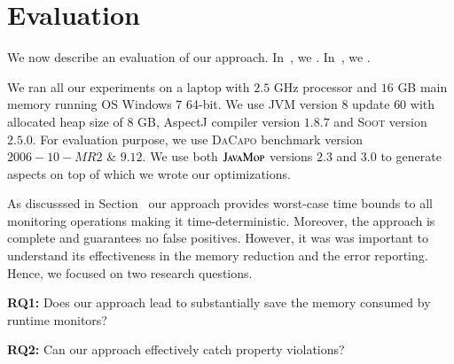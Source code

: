 \section{Evaluation}
\label{sec:evaluation}

We now describe an evaluation of our approach. 
In~, we . 
In~, we . 


We ran all our experiments on a laptop with $2.5$ GHz processor and $16$ GB main
memory running OS Windows 7 64-bit. We use JVM version $8$ update $60$ with
allocated heap size of $8$ GB, AspectJ compiler version $1.8.7$ and
\textsc{Soot} version $2.5.0$. For evaluation purpose, we use \textsc{DaCapo}
benchmark version $2006-10-MR2$ \& $9.12$. We use both $\textsc{JavaMop}$ versions
$2.3$ and $3.0$ to generate aspects on top of which we wrote our optimizations.


As discusssed in Section~ our approach 
provides worst-case time bounds to all monitoring operations making it 
time-deterministic. Moreover, the approach is complete and guarantees no false 
positives. However, it was was important to understand its effectiveness in the 
memory reduction and the error reporting. Hence, we focused on two research 
questions.

{\bf RQ1:} Does our approach lead to substantially save the memory consumed by 
runtime monitors?

{\bf RQ2:} Can our approach effectively catch property violations?

